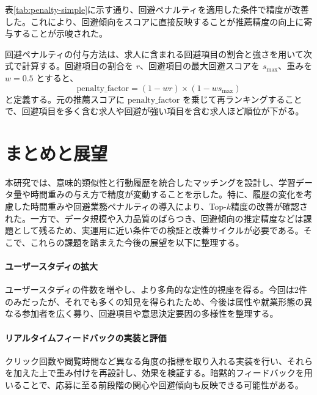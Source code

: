 \documentclass[twocolumn,a4j,dvipdfmx]{jsarticle_customized1}
\begin{document}
表\ref{tab:penalty-simple}に示す通り、回避ペナルティを適用した条件で精度が改善した。これにより、回避傾向をスコアに直接反映することが推薦精度の向上に寄与することが示唆された。

\begin{table}[H]
\caption{回避ペナルティの効果（学習20件・18名・時間重みなし）}
\label{tab:penalty-simple}
\centering
{}
\vspace{-0.5em}
\end{table}

回避ペナルティの付与方法は、求人に含まれる回避項目の割合と強さを用いて次式で計算する。回避項目の割合を $r$、回避項目の最大回避スコアを $s_{\max}$、重みを $w=0.5$ とすると、
\[
\text{penalty\_factor}=(1-wr)\times(1-ws_{\max})
\]
と定義する。元の推薦スコアに \(\text{penalty\_factor}\) を乗じて再ランキングすることで、回避項目を多く含む求人や回避が強い項目を含む求人ほど順位が下がる。

\section{まとめと展望}
本研究では、意味的類似性と行動履歴を統合したマッチングを設計し、学習データ量や時間重みの与え方で精度が変動することを示した。特に、履歴の変化を考慮した時間重みや回避業務ペナルティの導入により、Top-$k$精度の改善が確認された。一方で、データ規模や入力品質のばらつき、回避傾向の推定精度などは課題として残るため、実運用に近い条件での検証と改善サイクルが必要である。そこで、これらの課題を踏まえた今後の展望を以下に整理する。
\paragraph{ユーザースタディの拡大}
ユーザースタディの件数を増やし、より多角的な定性的視座を得る。今回は2件のみだったが、それでも多くの知見を得られたため、今後は属性や就業形態の異なる参加者を広く募り、回避項目や意思決定要因の多様性を整理する。

\paragraph{リアルタイムフィードバックの実装と評価}
クリック回数や閲覧時間など異なる角度の指標を取り入れる実装を行い、それらを加えた上で重み付けを再設計し、効果を検証する。暗黙的フィードバックを用いることで、応募に至る前段階の関心や回避傾向も反映できる可能性がある。
\end{document}
